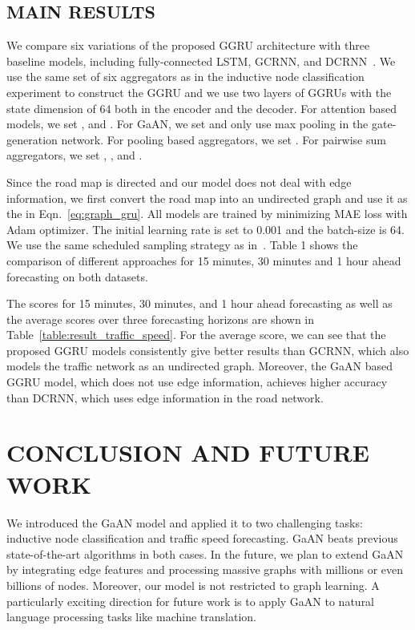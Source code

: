 \documentclass{article}
\begin{document}
	\subsection{MAIN RESULTS}
	
	We compare six variations of the proposed GGRU architecture with three baseline models, including fully-connected LSTM, GCRNN, and DCRNN~\citep{li2017graph}. We use the same set of six aggregators as in the inductive node classification experiment to construct the GGRU and we use two layers of GGRUs with the state dimension of 64 both in the encoder and the decoder. For attention based models, we set ,  and . For GaAN, we set  and only use max pooling in the gate-generation network. For pooling based aggregators, we set . For pairwise sum aggregators, we set , , and .
	
	Since the road map is directed and our model does not deal with edge information, we first convert the road map into an undirected graph and use it as the  in Eqn.~\eqref{eq:graph_gru}. All models are trained by minimizing MAE loss with Adam optimizer. The initial learning rate is set to 0.001 and the batch-size is 64. We use the same scheduled sampling strategy as in~\citep{li2017graph}. 
	Table 1 shows the comparison of different approaches for 15 minutes, 30 minutes and 1 hour ahead
	forecasting on both datasets.
	
	The scores for 15 minutes, 30 minutes, and 1 hour ahead forecasting as well as the average scores over three forecasting horizons are shown in Table~\ref{table:result_traffic_speed}. 
	For the average score, we can see that the proposed GGRU models consistently give better results than GCRNN, which also models the traffic network as an undirected graph. Moreover, the GaAN based GGRU model, which does not use edge information, achieves higher accuracy than DCRNN, which uses edge information in the road network.
	
	
\section{CONCLUSION AND FUTURE WORK}
	
	We introduced the GaAN model and applied it to two challenging tasks: inductive node classification and traffic speed forecasting. GaAN beats previous state-of-the-art algorithms in both cases. In the future, we plan to extend GaAN by integrating edge features and processing massive graphs with millions or even billions of nodes. 
Moreover, our model is not restricted to graph learning. A particularly exciting direction for future work is to apply GaAN to natural language processing tasks like machine translation.
	
	\newpage
	
	


	
	
	
\end{document}
